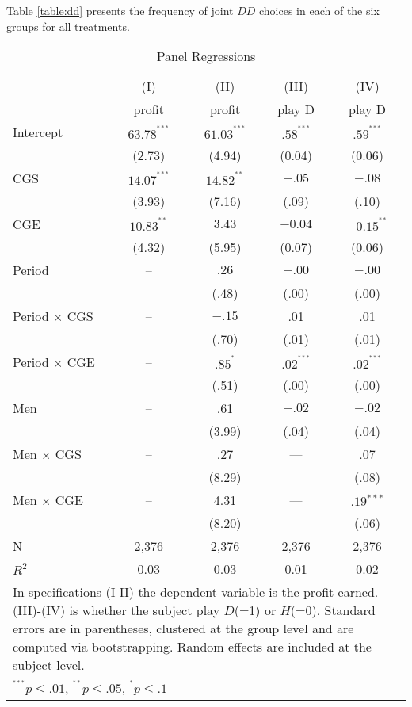 \documentclass[12pt, letterpaper]{article}
\theoremstyle{plain}
\begin{document}
Table \ref{table:dd} presents the frequency of joint $DD$ choices in each of the six groups for all treatments. 


\begin{table}[ht]
\centering
\caption{Panel Regressions}
\footnotesize
\begin{tabular}{lcccc}

  & (I) & (II) & (III) & (IV)\\
&  profit &  profit & play D & play D \\
    \hline
Intercept & $63.78^{^{***}}$ & $61.03^{^{***}}$ & $.58^{^{***}}$& $.59^{^{***}}$\\
& (2.73) & (4.94) & (0.04) & (0.06)\\
CGS &  $14.07^{^{***}}$  &  $14.82^{^{**}}$ &  $-.05$ & $-.08$\\
& (3.93)  & (7.16) & (.09) & (.10)\\
CGE  &  $10.83^{^{**}}$  &  $3.43$ &  $-0.04$ & $-0.15^{^{**}}$\\
 & (4.32) & (5.95) & (0.07) & (0.06)\\
 Period & -- & $.26$ &  $ -.00$ & $ -.00$\\
 & & (.48) & (.00) & (.00) \\
Period $\times$ CGS & --  & $-.15$ & .01 & .01 \\
 & &(.70) & (.01) & (.01) \\
Period $\times$ CGE & --  &$.85^{^{*}}$ & $.02^{^{***}}$ & $.02^{^{***}}$ \\
  && (.51) & (.00) &  (.00)\\
Men & --  & .61  & $-.02$ &  $-.02$ \\
 & &(3.99)  & (.04) & (.04)\\
Men $\times$ CGS &-- &  .27 & --- & .07\\
 && (8.29)&  & (.08)\\
Men $\times$ CGE & -- & 4.31 & --- & $.19{^{***}}$\\
&& (8.20)&& (.06)\\

\hline
N & 2,376 & 2,376 & 2,376  & 2,376  \\ 
$R^2$ & 0.03 & 0.03 & 0.01 & 0.02\\
\hline
\hline
 \multicolumn{5}{p{.55\textwidth}}{\scriptsize{In specifications (I-II) the dependent variable is the profit earned. (III)-(IV) is whether the subject play $D$(=1) or $H$(=0). Standard errors are in parentheses, clustered at the group level and are computed via bootstrapping. Random effects are included at the subject level. }}\\ 
 \multicolumn{5}{p{0.4\textwidth}}{\scriptsize{ $^{^{***}}p\leq.01$,
    $^{^{**}}p\leq.05$, $^{^{*}}p\leq.1$}} \\
\end{tabular}
\label{table:ols_all}
\end{table}
\end{document}
